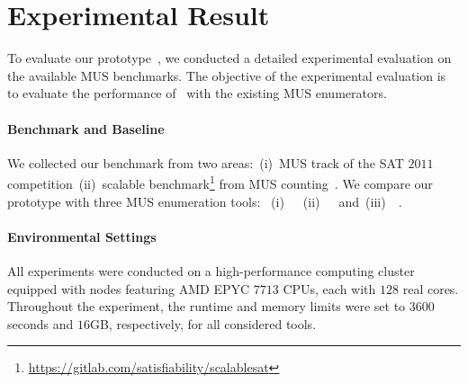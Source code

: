 \section{Experimental Result}
\label{section:experiment}
To evaluate our prototype~\toolname, we conducted a detailed experimental evaluation on the available MUS benchmarks.
The objective of the experimental evaluation is to evaluate the performance of \toolname~with the existing MUS enumerators.

\paragraph{Benchmark and Baseline}
We collected our benchmark from two areas:~(i)~MUS track of the SAT $2011$ competition~(ii)~scalable benchmark\footnote{\url{https://gitlab.com/satisfiability/scalablesat}} 
from MUS counting~\cite{BM2020}. We compare our prototype with three MUS enumeration tools: 
~(i)~\marco~\cite{LPMM2016}~(ii)~\unimus~\cite{BC2020}~and~(iii)~\remus~\cite{BCB2018}.

\paragraph{Environmental Settings}
All experiments were conducted on a high-performance computing cluster equipped with nodes featuring AMD EPYC $7713$ CPUs, each with $128$ real cores. 
Throughout the experiment, the runtime and memory limits were set to $3600$ seconds and $16$GB, respectively, for all considered tools.


